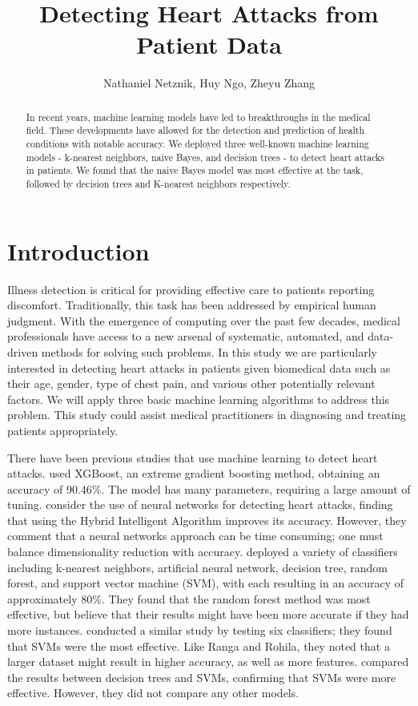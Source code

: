 \documentclass{article}
\title{Detecting Heart Attacks from Patient Data}
\author{Nathaniel Netznik, Huy Ngo, Zheyu Zhang}
\affil{CMPSC 445 - Applied Machine Learning in Data Science}
\date{}
\begin{document}
\maketitle
\begin{abstract}
In recent years, machine learning models have led to breakthroughs in the medical field. These developments have allowed for the detection and prediction of health conditions with notable accuracy. We deployed three well-known machine learning models - k-nearest neighbors, naive Bayes, and decision trees - to detect heart attacks in patients. We found that the naive Bayes model was most effective at the task, followed by decision trees and K-nearest neighbors respectively.
\end{abstract}
\section{Introduction}


Illness detection is critical for providing effective care to patients reporting discomfort. Traditionally, this task has been addressed by empirical human judgment. With the emergence of computing over the past few decades, medical professionals have access to a new arsenal of systematic, automated, and data-driven methods for solving such problems. In this study we are particularly interested in detecting heart attacks in patients given biomedical data such as their age, gender, type of chest pain, and various other potentially relevant factors. We will apply three basic machine learning algorithms to address this problem. This study could assist medical practitioners in diagnosing and treating patients appropriately.


There have been previous studies that use machine learning to detect heart attacks. \cite{karthikeyan} used XGBoost, an extreme gradient boosting method, obtaining an accuracy of 90.46\%. The model has many parameters, requiring a large amount of tuning. \cite{chitra} consider the use of neural networks for detecting heart attacks, finding that using the Hybrid Intelligent Algorithm improves its accuracy. However, they comment that a neural networks approach can be time consuming; one must balance dimensionality reduction with accuracy. \cite{ranga} deployed a variety of classifiers including k-nearest neighbors, artificial neural network, decision tree, random forest, and support vector machine (SVM), with each resulting in an accuracy of approximately 80\%. They found that the random forest method was most effective, but believe that their results might have been more accurate if they had more instances. \cite{ware} conducted a similar study by testing six classifiers; they found that SVMs were the most effective. Like Ranga and Rohila, they noted that a larger dataset might result in higher accuracy, as well as more features. \cite{gawale} compared the results  between decision trees and SVMs, confirming that SVMs were more effective. However, they did not compare any other models.
\end{document}
